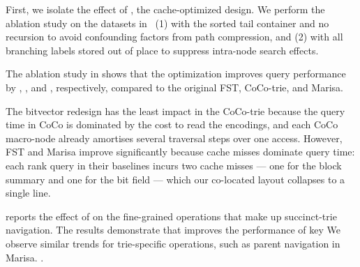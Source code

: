   First, we isolate the effect of \bvdesign, the cache-optimized \bv design.
  We perform the ablation study on the datasets in~ (1) with the
  sorted tail container and no recursion to avoid confounding factors from path
  compression, and (2) with all branching labels stored out of place to suppress
  intra-node search effects.

  The ablation study in  shows that the \bvdesign optimization
  improves query performance by \bvfstspeedup, \bvcocospeedup, and
  \bvmarisaspeedup, respectively, compared to the original FST, CoCo-trie, and
  Marisa. 

  The bitvector redesign has the least impact in the CoCo-trie because the query
  time in CoCo is dominated by the cost to read the encodings, and each
  CoCo macro-node already amortises several traversal steps over one \bv
  access. However, FST and Marisa improve significantly because \bv cache
  misses dominate query time: each rank query in their baselines incurs
  two cache misses --- one for the block summary and one for the bit field ---
  which our co-located layout collapses to a single line.

  

   reports the effect of \bvdesign on the fine-grained \bv
  operations that make up succinct-trie navigation. The results demonstrate that
  \bvdesign improves the performance of key 
  We observe similar trends for trie-specific operations, such as parent
  navigation in Marisa.
  .




